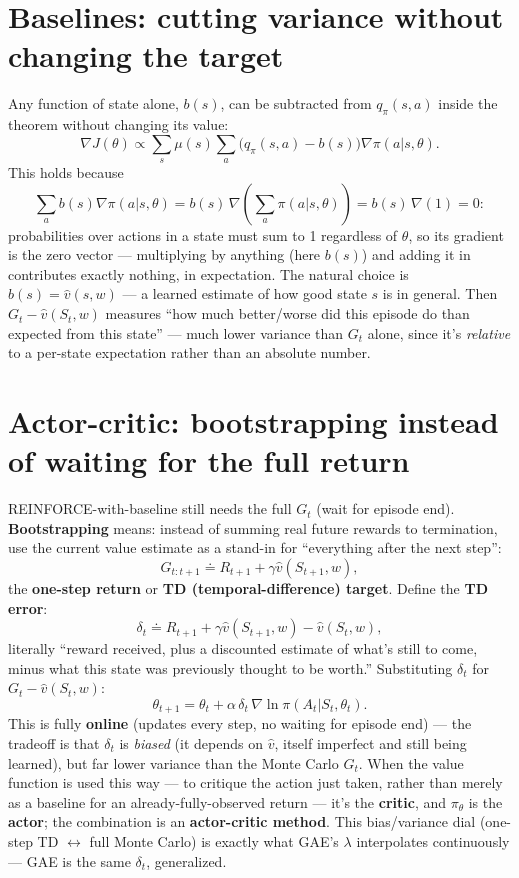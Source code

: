 \documentclass[11pt]{article}
\begin{document}
\section*{Baselines: cutting variance without changing the target}

Any function of state alone, $b(s)$, can be subtracted from $q_\pi(s,a)$ inside the
theorem without changing its value:
$$\nabla J(\theta) \propto \sum_s\mu(s)\sum_a\big(q_\pi(s,a)-b(s)\big)\nabla\pi(a|s,\theta).$$
This holds because
$$\sum_a b(s)\nabla\pi(a|s,\theta) = b(s)\,\nabla\!\left(\sum_a\pi(a|s,\theta)\right) = b(s)\,\nabla(1) = 0:$$
probabilities over actions in a state must sum to 1 regardless of $\theta$, so its gradient
is the zero vector --- multiplying by anything (here $b(s)$) and adding it in contributes
exactly nothing, in expectation. The natural choice is $b(s) = \hat v(s,w)$ --- a learned
estimate of how good state $s$ is in general. Then $G_t - \hat v(S_t,w)$ measures ``how
much better/worse did this episode do than expected from this state'' --- much lower
variance than $G_t$ alone, since it's \emph{relative} to a per-state expectation rather
than an absolute number.

\section*{Actor-critic: bootstrapping instead of waiting for the full return}

REINFORCE-with-baseline still needs the full $G_t$ (wait for episode end).
\textbf{Bootstrapping} means: instead of summing real future rewards to termination, use
the current value estimate as a stand-in for ``everything after the next step'':
$$G_{t:t+1} \doteq R_{t+1} + \gamma\hat v(S_{t+1}, w),$$
the \textbf{one-step return} or \textbf{TD (temporal-difference) target}. Define the
\textbf{TD error}:
$$\delta_t \doteq R_{t+1} + \gamma\hat v(S_{t+1},w) - \hat v(S_t,w),$$
literally ``reward received, plus a discounted estimate of what's still to come, minus
what this state was previously thought to be worth.'' Substituting $\delta_t$ for
$G_t - \hat v(S_t,w)$:
$$\theta_{t+1} = \theta_t + \alpha\,\delta_t\,\nabla\ln\pi(A_t|S_t,\theta_t).$$
This is fully \textbf{online} (updates every step, no waiting for episode end) --- the
tradeoff is that $\delta_t$ is \emph{biased} (it depends on $\hat v$, itself imperfect and
still being learned), but far lower variance than the Monte Carlo $G_t$. When the value
function is used this way --- to critique the action just taken, rather than merely as a
baseline for an already-fully-observed return --- it's the \textbf{critic}, and $\pi_\theta$
is the \textbf{actor}; the combination is an \textbf{actor-critic method}. This
bias/variance dial (one-step TD $\leftrightarrow$ full Monte Carlo) is exactly what GAE's
$\lambda$ interpolates continuously --- GAE is the same $\delta_t$, generalized.
\end{document}
